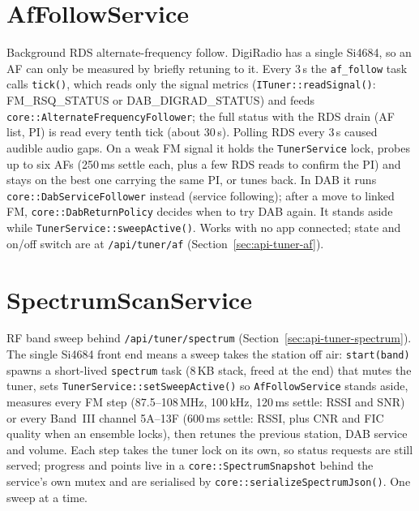 \section{AfFollowService}\label{cls:AfFollowService}
Background RDS alternate-frequency follow. DigiRadio has a single Si4684,
so an AF can only be measured by briefly retuning to it. Every 3\,s the
\texttt{af\_follow} task calls \texttt{tick()}, which reads only the signal
metrics (\texttt{ITuner::readSignal()}: FM\_RSQ\_STATUS or
DAB\_DIGRAD\_STATUS) and feeds \texttt{core::AlternateFrequencyFollower};
the full status with the RDS drain (AF list, PI) is read every tenth tick
(about 30\,s). Polling RDS every 3\,s caused audible audio gaps.
On a weak FM signal it holds the \texttt{TunerService} lock, probes up to six
AFs (250\,ms settle each, plus a few RDS reads to confirm the PI) and stays
on the best one carrying the same PI, or tunes back. In DAB it runs
\texttt{core::DabServiceFollower} instead (service following); after a
move to linked FM, \texttt{core::DabReturnPolicy} decides when to try DAB
again. It stands aside while \texttt{TunerService::sweepActive()}. Works with
no app connected; state and on/off switch are at \texttt{/api/tuner/af}
(Section~\ref{sec:api-tuner-af}).

\section{SpectrumScanService}\label{cls:SpectrumScanService}
RF band sweep behind \texttt{/api/tuner/spectrum}
(Section~\ref{sec:api-tuner-spectrum}). The single Si4684 front end
means a sweep takes the station off air: \texttt{start(band)} spawns a
short-lived \texttt{spectrum} task (8\,KB stack, freed at the end) that
mutes the tuner, sets \texttt{TunerService::setSweepActive()} so
\texttt{AfFollowService} stands aside, measures every FM step
(87.5--108\,MHz, 100\,kHz, 120\,ms settle: RSSI and SNR) or every Band~III
channel 5A--13F (600\,ms settle: RSSI, plus CNR and FIC quality when an
ensemble locks), then retunes the previous station, DAB service and
volume. Each step takes the tuner lock on its own, so status requests are
still served; progress and points live in a
\texttt{core::SpectrumSnapshot} behind the service's own mutex and are
serialised by \texttt{core::serializeSpectrumJson()}. One sweep at a time.

